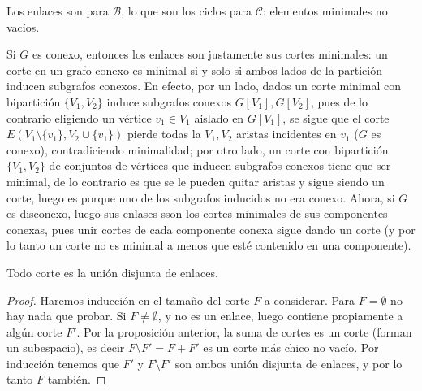 \documentclass[../main.tex]{subfiles}
\begin{document}
\begin{obs}
Los enlaces son para $\mathcal B$, lo que son los ciclos para $\mathcal C$: elementos minimales no vacíos.

Si $G$ es conexo, entonces los enlaces son justamente sus cortes minimales: un corte en un grafo conexo es minimal si y solo si ambos lados de la partición inducen subgrafos conexos. En efecto, por un lado, dados un corte minimal con bipartición $\{V_1,V_2\}$ induce subgrafos conexos $G[V_1],G[V_2]$, pues de lo contrario eligiendo un vértice $v_1 \in V_1$ aislado en $G[V_1]$, se sigue que el corte $E(V_1 \setminus \{v_1 \}, V_2 \cup \{ v_1 \})$ pierde todas la $V_1,V_2$ aristas incidentes en $v_1$ ($G$ es conexo), contradiciendo minimalidad; por otro lado, un corte con bipartición $\{V_1,V_2\}$ de conjuntos de vértices que inducen subgrafos conexos tiene que ser minimal, de lo contrario es que se le pueden quitar aristas y sigue siendo un corte, luego es porque uno de los subgrafos inducidos no era conexo. Ahora, si $G$ es disconexo, luego sus enlases sson los cortes minimales de sus componentes conexas, pues unir cortes de cada componente conexa sigue dando un corte (y por lo tanto un corte no es minimal a menos que esté contenido en una componente).
\end{obs}

\begin{lemma}
Todo corte es la unión disjunta de enlaces.
\end{lemma}
\begin{proof}
Haremos inducción en el tamaño del corte $F$ a considerar. Para $F = \emptyset$ no hay nada que probar. Si $F \neq \emptyset$, y no es un enlace, luego contiene propiamente a algún corte $F'$. Por la proposición anterior, la suma de cortes es un corte (forman un subespacio), es decir $F \setminus F' = F + F'$ es un corte más chico no vacío. Por inducción tenemos que $F'$ y $F \setminus F'$ son ambos unión disjunta de enlaces, y por lo tanto $F$ también.
\end{proof}
\end{document}
